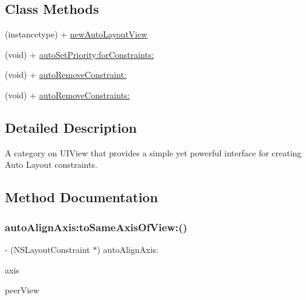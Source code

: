 \subsection*{Class Methods}
\begin{DoxyCompactItemize}
\item 
(instancetype) + \mbox{\hyperlink{category_u_i_view_07_auto_layout_08_a8d17d4e49ad82545614adadf39a7d09d}{new\+Auto\+Layout\+View}}
\item 
(void) + \mbox{\hyperlink{category_u_i_view_07_auto_layout_08_ab9a373067b5a2727fba8360d691bfc38}{auto\+Set\+Priority\+:for\+Constraints\+:}}
\item 
(void) + \mbox{\hyperlink{category_u_i_view_07_auto_layout_08_a0a504b06b11b7d88345cb87aa63c6d47}{auto\+Remove\+Constraint\+:}}
\item 
(void) + \mbox{\hyperlink{category_u_i_view_07_auto_layout_08_a548b9f2dbc916fa03a435ab4e89d2af6}{auto\+Remove\+Constraints\+:}}
\end{DoxyCompactItemize}


\subsection{Detailed Description}
A category on U\+I\+View that provides a simple yet powerful interface for creating Auto Layout constraints. 

\subsection{Method Documentation}
\mbox{\label{category_u_i_view_07_auto_layout_08_abdb4263d82cb273ce130db9a88bc3ae8}} 
\subsubsection{\texorpdfstring{auto\+Align\+Axis\+:to\+Same\+Axis\+Of\+View\+:()}{autoAlignAxis:toSameAxisOfView:()}}
{\footnotesize\ttfamily -\/ (N\+S\+Layout\+Constraint $\ast$) auto\+Align\+Axis\+: \begin{DoxyParamCaption}\item[{(A\+L\+Axis)}]{axis }\item[{toSameAxisOfView:(U\+I\+View $\ast$)}]{peer\+View }\end{DoxyParamCaption}}

